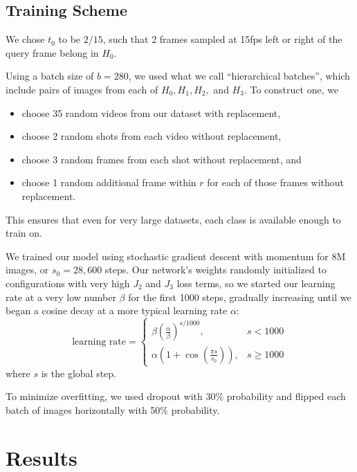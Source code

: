 \documentclass{article}
\begin{document}
\begin{multicols}{2}
\subsection{Training Scheme}

We chose $t_0$ to be $2/15$, such that 2 frames sampled at 15fps left or right of the query frame belong in $H_0$.

Using a batch size of $b=280$, we used what we call ``hierarchical batches'', which include pairs of images from each of $H_0, H_1, H_2,$ and $H_3$.
To construct one, we
\begin{itemize}
\item choose 35 random videos from our dataset with replacement,
\item choose 2 random shots from each video without replacement,
\item choose 3 random frames from each shot without replacement, and
\item choose 1 random additional frame within $r$ for each of those frames without replacement.
\end{itemize}
This ensures that even for very large datasets, each class is available enough to train on.

We trained our model using stochastic gradient descent with momentum for 8M images, or $s_0 = 28,600$  steps. Our network's weights randomly initialized to configurations with very high $J_2$ and $J_3$ loss terms, so we started our learning rate at a very low number $\beta$ for the first 1000 steps, gradually increasing until we began a cosine decay at a more typical learning rate $\alpha$:
\[\text{learning rate} = \begin{cases}
\beta \left(\frac{\alpha}{\beta}\right)^{s / 1000}, & s < 1000 \\
\alpha\left(1 + \cos\left(\frac{\pi s}{s_0}\right)\right), & s \ge 1000
\end{cases}\]
where $s$ is the global step.

To minimize overfitting, we used dropout with 30\% probability and flipped each batch of images horizontally with 50\% probability.


\section{Results}


\end{multicols}
\end{document}
